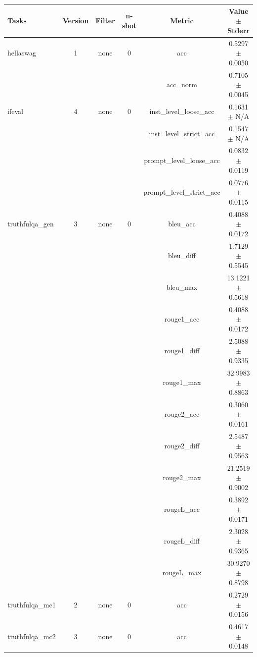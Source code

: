 \documentclass{ifacconf}
\begin{document}
\begin{strip}
\begin{minipage}{\textwidth}
    \begin{table}[H]
    \centering
    \begin{tabular}{|l|c|c|c|c|c|}
    \hline
    \textbf{Tasks} & \textbf{Version} & \textbf{Filter} & \textbf{n-shot} & \textbf{Metric} & \textbf{Value} $\pm$ \textbf{Stderr} \\ \hline
    hellaswag & 1 & none & 0 & acc & 0.5297 $\pm$ 0.0050 \\ \hline
    & & & & acc\_norm & 0.7105 $\pm$ 0.0045 \\ \hline
    ifeval & 4 & none & 0 & inst\_level\_loose\_acc & 0.1631 $\pm$ N/A \\ \hline
    & & & & inst\_level\_strict\_acc & 0.1547 $\pm$ N/A \\ \hline
    & & & & prompt\_level\_loose\_acc & 0.0832 $\pm$ 0.0119 \\ \hline
    & & & & prompt\_level\_strict\_acc & 0.0776 $\pm$ 0.0115 \\ \hline
    truthfulqa\_gen & 3 & none & 0 & bleu\_acc & 0.4088 $\pm$ 0.0172 \\ \hline
    & & & & bleu\_diff & 1.7129 $\pm$ 0.5545 \\ \hline
    & & & & bleu\_max & 13.1221 $\pm$ 0.5618 \\ \hline
    & & & & rouge1\_acc & 0.4088 $\pm$ 0.0172 \\ \hline
    & & & & rouge1\_diff & 2.5088 $\pm$ 0.9335 \\ \hline
    & & & & rouge1\_max & 32.9983 $\pm$ 0.8863 \\ \hline
    & & & & rouge2\_acc & 0.3060 $\pm$ 0.0161 \\ \hline
    & & & & rouge2\_diff & 2.5487 $\pm$ 0.9563 \\ \hline
    & & & & rouge2\_max & 21.2519 $\pm$ 0.9002 \\ \hline
    & & & & rougeL\_acc & 0.3892 $\pm$ 0.0171 \\ \hline
    & & & & rougeL\_diff & 2.3028 $\pm$ 0.9365 \\ \hline
    & & & & rougeL\_max & 30.9270 $\pm$ 0.8798 \\ \hline
    truthfulqa\_mc1 & 2 & none & 0 & acc & 0.2729 $\pm$ 0.0156 \\ \hline
    truthfulqa\_mc2 & 3 & none & 0 & acc & 0.4617 $\pm$ 0.0148 \\ \hline
    \end{tabular}
    \label{tab:llama31_q8}
    \end{table}


\end{minipage}
\end{strip}
\end{document}
